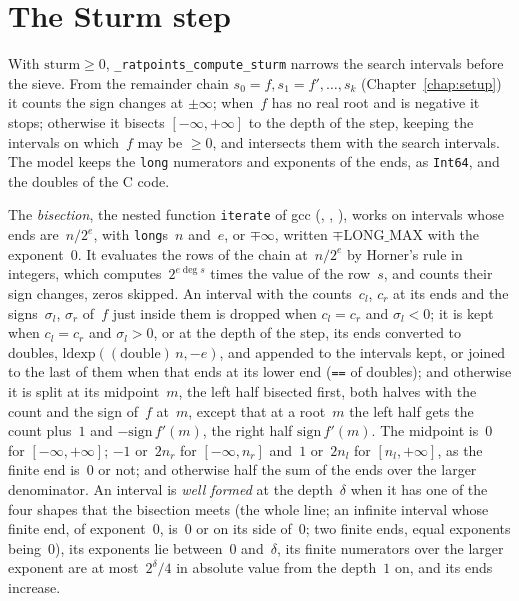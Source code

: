 \section{The Sturm step}\label{sec:sturmStep}

With $\mathrm{sturm} \ge 0$, \verb|_ratpoints_compute_sturm| narrows the search intervals before the
sieve. From the remainder chain $s_0 = f, s_1 = f', \dots, s_k$ (Chapter~\ref{chap:setup}) it
counts the sign changes at $\pm\infty$; when~$f$ has no real root and is negative it stops;
otherwise it bisects $[-\infty, +\infty]$ to the depth of the step, keeping the intervals on
which~$f$ may be $\ge 0$, and intersects them with the search intervals. The model keeps the
\verb|long| numerators and exponents of the ends, as \verb|Int64|, and the doubles of the C code.

\begin{definition}\label{def:computeSturm}
  \leanok
  The \emph{bisection}, the nested function \verb|iterate| of gcc (,
  , ), works on intervals whose ends
  are~$n/2^e$, with \verb|long|s~$n$ and~$e$, or $\mp\infty$, written $\mp\mathrm{LONG\_MAX}$ with
  the exponent~$0$. It evaluates the rows of the chain at~$n/2^e$ by Horner's rule in integers,
  which computes~$2^{e \deg s}$ times the value of the row~$s$, and counts their sign changes, zeros
  skipped. An interval with the counts~$c_l$, $c_r$ at its ends and the signs~$\sigma_l$, $\sigma_r$
  of~$f$ just inside them is dropped when $c_l = c_r$ and $\sigma_l < 0$; it is kept when
  $c_l = c_r$ and $\sigma_l > 0$, or at the depth of the step, its ends converted to doubles,
  $\mathrm{ldexp}((\mathrm{double})\,n, -e)$, and appended to the intervals kept, or joined to the
  last of them when that ends at its lower end (\verb|==| of doubles); and otherwise it is split at
  its midpoint~$m$, the left half bisected first, both halves with the count and the sign of~$f$
  at~$m$, except that at a root~$m$ the left half gets the count plus~$1$ and
  $-\mathrm{sign}\, f'(m)$, the right half $\mathrm{sign}\, f'(m)$. The midpoint is~$0$ for
  $[-\infty, +\infty]$; $-1$ or~$2 n_r$ for $[-\infty, n_r]$ and~$1$ or~$2 n_l$ for
  $[n_l, +\infty]$, as the finite end is~$0$ or not; and otherwise half the sum of the ends over the
  larger denominator. An interval is \emph{well formed} at the depth~$\delta$ when it has one of the
  four shapes that the bisection meets (the whole line; an infinite interval whose finite end, of
  exponent~$0$, is~$0$ or on its side of~$0$; two finite ends, equal exponents being~$0$), its
  exponents lie between~$0$ and~$\delta$, its finite numerators over the larger exponent are at
  most~$2^{\delta}/4$ in absolute value from the depth~$1$ on, and its ends increase.


\end{definition}

